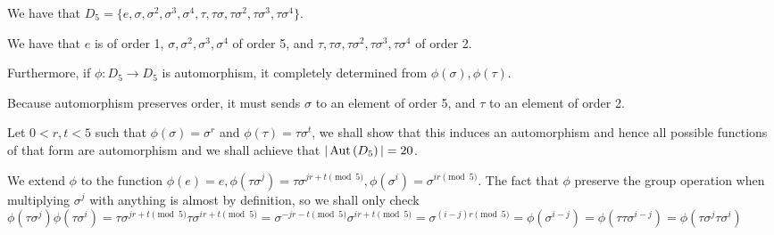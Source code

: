 \begin{cExercise}
	We have that $D_5=\{e,\sigma,\sigma^2,\sigma^3,\sigma^4,\tau,\tau\sigma,\tau\sigma^2,\tau\sigma^3,\tau\sigma^4\}$.
	
	We have that $e$ is of order 1, $\sigma,\sigma^2,\sigma^3,\sigma^4$ of order 5, and $\tau,\tau\sigma,\tau\sigma^2,\tau\sigma^3,\tau\sigma^4$ of order 2.
	
	Furthermore, if $\phi:D_5\to D_5$ is automorphism, it completely determined from $\phi(\sigma),\phi(\tau)$.
	
	Because automorphism preserves order, it must sends $\sigma$ to an element of order 5, and $\tau$ to an element of order 2.
	
	Let $0<r,t<5$ such that $\phi(\sigma)=\sigma^r$ and $\phi(\tau)=\tau\sigma^t$, we shall show that this induces an automorphism and hence all possible functions of that form are automorphism and we shall achieve that $|\operatorname{Aut}\left(D_5\right)|=20$.
	
	We extend $\phi$ to the function $\phi(e)=e,\phi(\tau\sigma^j)=\tau\sigma^{jr+t\pmod 5},\phi(\sigma^i)=\sigma^{ir\pmod 5}$. The fact that $\phi$ preserve the group operation when multiplying $\sigma^j$ with anything is almost by definition, so we shall only check $\phi(\tau\sigma^j)\phi(\tau\sigma^i)=\tau\sigma^{jr+t\pmod 5}\tau\sigma^{ir+t\pmod 5}=\sigma^{-jr-t\pmod 5}\sigma^{ir+t\pmod 5}=\sigma^{(i-j)r\pmod 5}=\phi(\sigma^{i-j})=\phi(\tau\tau\sigma^{i-j})=\phi(\tau\sigma^{j}\tau\sigma^i)$
\end{cExercise}
